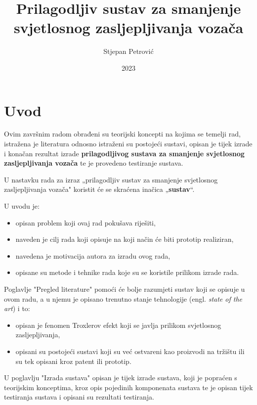 \documentclass{foi}
\title{Prilagodljiv sustav za smanjenje svjetlosnog zasljepljivanja vozača}
\author{Stjepan Petrović}
\date{2023}
\begin{document}
\justifying



\maketitle

\tableofcontents

\pagestyle{plain}
\chapter{Uvod}

Ovim završnim radom obrađeni su teorijski koncepti na kojima se temelji rad, istražena je literatura odnosno istraženi su postojeći sustavi, opisan je tijek izrade i konačan rezultat izrade \textbf{prilagodljivog sustava za smanjenje svjetlosnog zasljepljivanja vozača} te je provedeno testiranje sustava.

U nastavku rada za izraz „prilagodljiv sustav za smanjenje svjetlosnog zasljepljivanja vozača" koristit će se skraćena inačica „\textbf{sustav}“.

\flushleft U uvodu je:
\justifying
\begin{itemize}[noitemsep]
    \item opisan problem koji ovaj rad pokušava riješiti,
    \item naveden je cilj rada koji opisuje na koji način će biti prototip realiziran,
    \item navedena je motivacija autora za izradu ovog rada,
    \item opisane su metode i tehnike rada koje su se koristile prilikom izrade rada.
\end{itemize}

\flushleft Poglavlje "Pregled literature" pomoći će bolje razumjeti sustav koji se opisuje u ovom radu, a u njemu je opisano trenutno stanje tehnologije (engl. \emph{state of the art}) i to:
\justifying
\begin{itemize}[noitemsep]
    \item opisan je fenomen Troxlerov efekt koji se javlja prilikom svjetlosnog zasljepljivanja,
    \item opisani su postojeći sustavi koji su već ostvareni kao proizvodi na tržištu ili su tek opisani kroz patent ili prototip.
\end{itemize}

U poglavlju "Izrada sustava" opisan je tijek izrade sustava, koji je popraćen s teorijskim konceptima, kroz opis pojedinih komponenata sustava te je opisan tijek testiranja sustava i opisani su rezultati testiranja.
\end{document}
